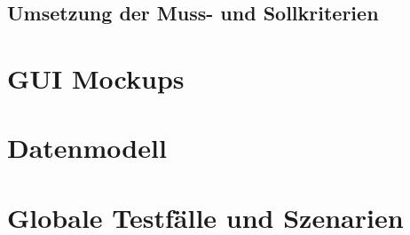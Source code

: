\documentclass[a4paper,12pt]{article}
\begin{document}
\subsection{Umsetzung der Muss- und Sollkriterien}

\section{GUI Mockups}

\section{Datenmodell}

\section{Globale Testfälle und Szenarien}

\clearpage

\end{document}
